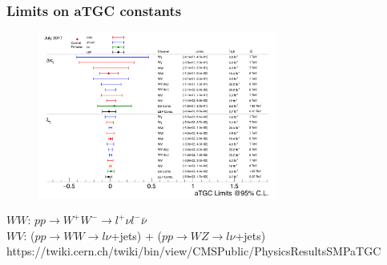 \begin{frame}\frametitle{Limits on aTGC constants}
  \begin{figure}[htb]
    \begin{center}
       \includegraphics[width=0.70\textwidth]{../figs/ForPresentation/aTGC_cg.png} 
    \end{center}
  \end{figure}
  \scriptsize
  $WW$: $pp \rightarrow W^+ W^- \rightarrow l^+ \nu l^- \bar{\nu}$\\
  $WV$: ($pp \rightarrow WW \rightarrow l \nu$+jets) + ($pp \rightarrow WZ \rightarrow l \nu$+jets)
  \tiny
  https://twiki.cern.ch/twiki/bin/view/CMSPublic/PhysicsResultsSMPaTGC
\end{frame}%

